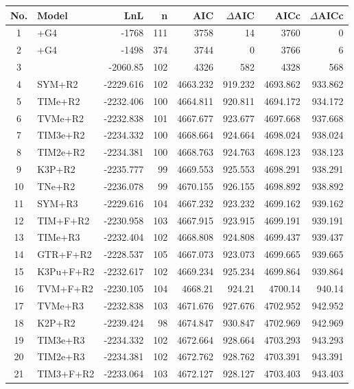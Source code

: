 \documentclass[12pt]{article}
\begin{document}
  \singlespacing
\singlespacing
\begin{longtable}{clrrrrrr}
	No. & Model & LnL & n & AIC & $\Delta$AIC & AICc & $\Delta$AICc \\ \hline
	1 & \selacDMS+G4 & -1768 & 111 & 3758 & 14 & 3760 & 0 \\ 
	2 & \selac+G4 & -1498 & 374 & 3744 & 0 & 3766 & 6 \\ 
	3 & \phydms & -2060.85 & 102 & 4326 & 582 & 4328 & 568 \\ 
	4 & SYM+R2 & -2229.616 & 102 & 4663.232 & 919.232 & 4693.862 & 933.862 \\ 
	5 & TIMe+R2 & -2232.406 & 100 & 4664.811 & 920.811 & 4694.172 & 934.172 \\ 
	6 & TVMe+R2 & -2232.838 & 101 & 4667.677 & 923.677 & 4697.668 & 937.668 \\ 
	7 & TIM3e+R2 & -2234.332 & 100 & 4668.664 & 924.664 & 4698.024 & 938.024 \\ 
	8 & TIM2e+R2 & -2234.381 & 100 & 4668.763 & 924.763 & 4698.123 & 938.123 \\ 
	9 & K3P+R2 & -2235.777 & 99 & 4669.553 & 925.553 & 4698.291 & 938.291 \\ 
	10 & TNe+R2 & -2236.078 & 99 & 4670.155 & 926.155 & 4698.892 & 938.892 \\ 
	11 & SYM+R3 & -2229.616 & 104 & 4667.232 & 923.232 & 4699.162 & 939.162 \\ 
	12 & TIM+F+R2 & -2230.958 & 103 & 4667.915 & 923.915 & 4699.191 & 939.191 \\ 
	13 & TIMe+R3 & -2232.404 & 102 & 4668.808 & 924.808 & 4699.437 & 939.437 \\ 
	14 & GTR+F+R2 & -2228.537 & 105 & 4667.073 & 923.073 & 4699.665 & 939.665 \\ 
	15 & K3Pu+F+R2 & -2232.617 & 102 & 4669.234 & 925.234 & 4699.864 & 939.864 \\ 
	16 & TVM+F+R2 & -2230.105 & 104 & 4668.21 & 924.21 & 4700.14 & 940.14 \\ 
	17 & TVMe+R3 & -2232.838 & 103 & 4671.676 & 927.676 & 4702.952 & 942.952 \\ 
	18 & K2P+R2 & -2239.424 & 98 & 4674.847 & 930.847 & 4702.969 & 942.969 \\ 
	19 & TIM3e+R3 & -2234.332 & 102 & 4672.664 & 928.664 & 4703.293 & 943.293 \\ 
	20 & TIM2e+R3 & -2234.381 & 102 & 4672.762 & 928.762 & 4703.391 & 943.391 \\ 
	21 & TIM3+F+R2 & -2233.064 & 103 & 4672.127 & 928.127 & 4703.403 & 943.403 \\ 

\end{longtable}
\end{document}

